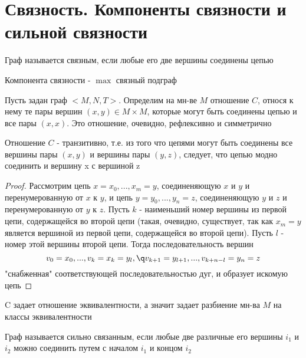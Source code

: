 \documentclass[discrete.tex]{subfiles}
\begin{document}
  \section{Связность. Компоненты связности и сильной связности}

  \begin{definition}
    Граф называется связным, если любые его две вершины соединены цепью
  \end{definition}

  \begin{definition}
    Компонента связности - $\max$ связный подграф
  \end{definition}

  \begin{definition}
    Пусть задан граф $<M,N,T>$. Определим на мн-ве $M$ отношение $C$, относя к нему те пары вершин $(x,y) \in M \times M$, которые могут быть соединены цепью и все пары $(x,x)$. Это отношение, очевидно, рефлексивно и симметрично
  \end{definition}

  \begin{lemma}
    Отношение $C$ - транзитивно, т.е. из того что цепями могут быть соединены все вершины пары $(x,y)$ и вершины пары $(y,z)$, следует, что цепью модно соединить и вершину x с вершиной z
  \end{lemma}

  \begin{proof}
    Рассмотрим цепь $x=x_0,...,x_m=y$, соединеняющую $x$ и $y$ и перенумерованную от $x$ к $y$, и цепь $y=y_0,...,y_n=z$, соединеняющую $y$ и $z$ и перенумерованную от $y$ к $z$. Пусть $k$ - наименьший номер вершины из первой цепи, содержащейся во второй цепи (такая, очевидно, существует, так как $x_m=y$ является вершиной из первой цепи, содержащейся во второй цепи). Пусть $l$ - номер этой вершины второй цепи. Тогда последовательность вершин
    \[v_0=x_0,...,v_k=x_k=y_l,\q v_{k+1}=y_{l+1},...,v_{k+n-l}=y_n=z\]
    "снабженная"{} соответствующей последовательностью дуг, и образует искомую цепь
  \end{proof}

  \begin{consequence}
    C задает отношение эквивалентности, а значит задает разбиение мн-ва $M$ на классы эквивалентности
  \end{consequence}

  \begin{definition}
    Граф называется сильно связанным, если любые две различные его вершины $i_1$ и $i_2$ можно соединить путем с началом $i_1$ и концом $i_2$
  \end{definition}
\end{document}
